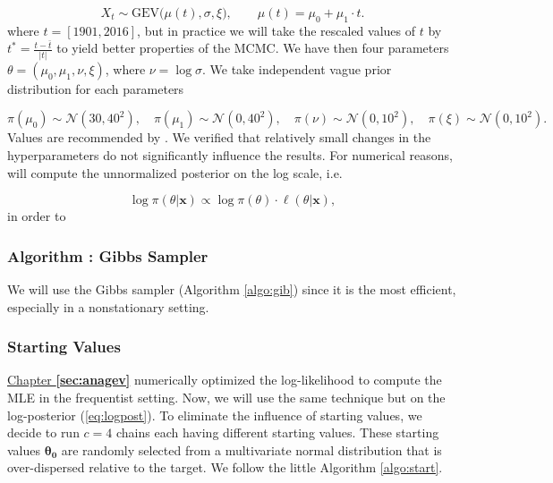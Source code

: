 \begin{equation*}
X_{t}\sim \text{GEV}\big(\mu(t), \sigma, \xi\big), \qquad \mu(t)= \mu_0+\mu_1\cdot t.
\end{equation*}
where $t=[1901,2016]$, but in practice we will take the rescaled values of $t$ by $t^{*} = \frac{t - \bar{t} }{|t|}$ to yield better properties of the  MCMC. 
We have then four parameters $\theta=(\mu_0,\mu_1,\nu,\xi)$, where $\nu=\log\sigma$. We take independent vague prior distribution for each parameters 

\begin{equation*}
\pi(\mu_0)\sim\mathcal{N}(30,40^2),\quad \pi(\mu_1)\sim\mathcal{N}(0,40^2),\quad \pi(\nu)\sim\mathcal{N}(0,10^2),\quad
\pi(\xi)\sim\mathcal{N}(0,10^2).
\end{equation*}
Values are recommended by \citet[chap.13]{dey_extreme_2016}. We verified that relatively small changes in the hyperparameters do not significantly influence the results.
For numerical reasons, will compute the unnormalized posterior on the log scale, i.e.

\begin{equation}\label{eq:logpost}
\log\pi(\theta|\boldsymbol{x})\propto \log\pi(\theta)\cdot \ell(\theta|\boldsymbol{x}),
\end{equation}
in order to 

\subsubsection*{Algorithm : Gibbs Sampler}

We will use the Gibbs sampler (Algorithm \ref{algo:gib}) since it is the most efficient, especially in a nonstationary setting.


\subsubsection*{Starting Values}

\hyperref[sec:anagev]{Chapter \textbf{\ref{sec:anagev}}} numerically optimized the log-likelihood to compute the MLE in the frequentist setting. Now, we will use the same technique but on the log-posterior (\ref{eq:logpost}).
To eliminate the influence of starting values, we decide to run $c=4$ chains each having different starting values. These starting values $\boldsymbol{\theta_0}$ are randomly selected from a multivariate normal distribution that is over-dispersed relative to the target. We follow the little Algorithm \ref{algo:start}.

